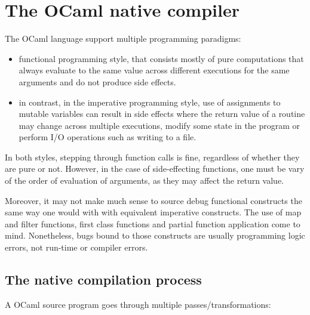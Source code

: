 \chapter{The OCaml native compiler\label{cha:chapter3}}

The OCaml language support multiple programming paradigms:
\begin{itemize}
    \item functional programming style, that consists mostly of pure computations that always
        evaluate to the same value across different executions for the same arguments
        and do not produce side effects.
    \item in contrast, in the imperative programming style,
        use of assignments to mutable variables can result in side effects
        where the return value of a routine may change across multiple executions,
        modify some state in the program or perform I/O operations
        such as writing to a file.
\end{itemize}

In both styles, stepping through function calls is fine, regardless of whether
they are pure or not.
However, in the case of side-effecting functions, one must be vary of the order of
evaluation of arguments, as they may affect the return value.

Moreover, it may not make much sense to source debug functional constructs
the same way one would with with equivalent imperative constructs.
The use of map and filter functions, first class functions and
partial function application come to mind.
Nonetheless, bugs bound to those constructs are usually programming
logic errors, not run-time or compiler errors.

\section{The native compilation process}

A OCaml source program goes through multiple passes/transformations:

